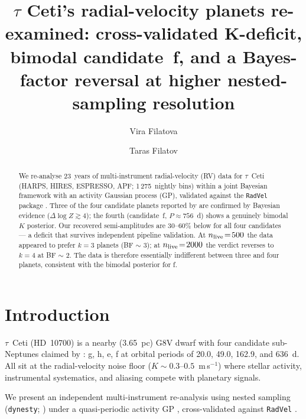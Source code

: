 \documentclass[RNAAS]{aastex701}
\begin{document}
\title{$\tau$ Ceti's radial-velocity planets re-examined: cross-validated K-deficit, bimodal candidate~f, and a Bayes-factor reversal at higher nested-sampling resolution}

\author[0009-0007-3246-0182]{Vira Filatova}

\author[0009-0001-5205-5519]{Taras Filatov}

\begin{abstract}
\noindent
We re-analyse 23~years of multi-instrument radial-velocity (RV) data for $\tau$~Ceti (HARPS, HIRES, ESPRESSO, APF; 1\,275~nightly bins) within a joint Bayesian framework with an activity Gaussian process (GP), validated against the \texttt{RadVel} package \citep{Fulton2018}. Three of the four candidate planets reported by \citet{Feng2017} are confirmed by Bayesian evidence ($\Delta\log Z \gtrsim 4$); the fourth (candidate~f, $P\!\approx\!756$~d) shows a genuinely bimodal $K$ posterior. Our recovered semi-amplitudes are 30--60\% below \citet{Feng2017} for all four candidates --- a deficit that survives independent pipeline validation. At $n_{\rm live}\!=\!500$ the data appeared to prefer $k\!=\!3$ planets (BF $\sim$ 3); at $n_{\rm live}\!=\!2000$ the verdict reverses to $k\!=\!4$ at BF $\sim$ 2. The data is therefore essentially indifferent between three and four planets, consistent with the bimodal posterior for f.
\end{abstract}


\section{Introduction}

$\tau$~Ceti (HD~10700) is a nearby (3.65~pc) G8V dwarf with four candidate sub-Neptunes claimed by \citet{Feng2017}: g, h, e, f at orbital periods of 20.0, 49.0, 162.9, and 636~d. All sit at the radial-velocity noise floor ($K \sim 0.3$--$0.5$~m\,s$^{-1}$) where stellar activity, instrumental systematics, and aliasing compete with planetary signals.

We present an independent multi-instrument re-analysis using nested sampling (\texttt{dynesty}; \citealt{Speagle2020}) under a quasi-periodic activity GP \citep{Foreman-Mackey2017}, cross-validated against \texttt{RadVel} \citep{Fulton2018}.
\end{document}
